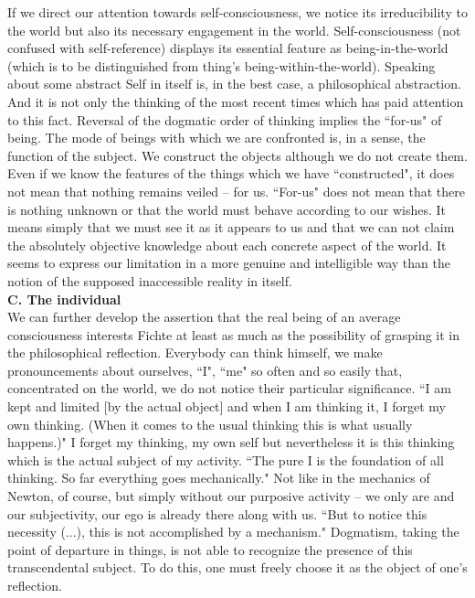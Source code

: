 If we direct our attention towards self-consciousness, we notice its irreducibility to the world but also its 
necessary engagement in the world. Self-consciousness (not confused with self-reference) displays its essential 
feature as being-in-the-world (which is to be distinguished from thing's being-within-the-world). Speaking about 
some abstract Self in itself is, in the best case, a philosophical abstraction. And it is not only the thinking of the 
most recent times which has paid attention to this fact.
Reversal of the dogmatic order of thinking implies the ``for-us" of being. The mode of beings with which we are 
confronted is, in a sense, the function of the subject. We construct the objects although we do not create them. Even 
if we know the features of the things which we have ``constructed", it does not mean that nothing remains veiled -- 
for us. ``For-us" does not mean that there is nothing unknown or that the world must behave according to our 
wishes. It means simply that we must see it as it appears to us and that we can not claim the absolutely objective 
knowledge about each concrete aspect of the world. It seems to express our limitation in a more genuine and 
intelligible way than the notion of the supposed inaccessible reality in itself. \\[1ex]
{\bf C. The individual} \\
We can further develop the assertion that the real being of an average consciousness interests Fichte at least 
as much as the possibility of grasping it in the philosophical reflection. Everybody can think himself, we make 
pronouncements about ourselves, ``I", ``me" so often and so easily that, concentrated on the world, we do not notice 
their particular significance. ``I am kept and limited [by the actual object] and when I am thinking it, I forget my 
own thinking. (When it comes to the usual thinking  this is what usually happens.)"  \cite{ITS} I forget my thinking, my 
own self but nevertheless it is this thinking which is the actual subject of my activity. ``The pure I is the 
foundation of all thinking. So far everything goes mechanically." \cite{ITS} Not like in the mechanics of Newton, of 
course, but simply without our purposive activity -- we only are and our subjectivity, our ego is already there along 
with us. ``But to notice this necessity (...), this is not accomplished by a mechanism." \cite{ITS} Dogmatism, taking the 
point of departure in things, is not able to recognize the presence of this transcendental subject. To do this, one 
must freely choose it as the object of one's reflection. 

